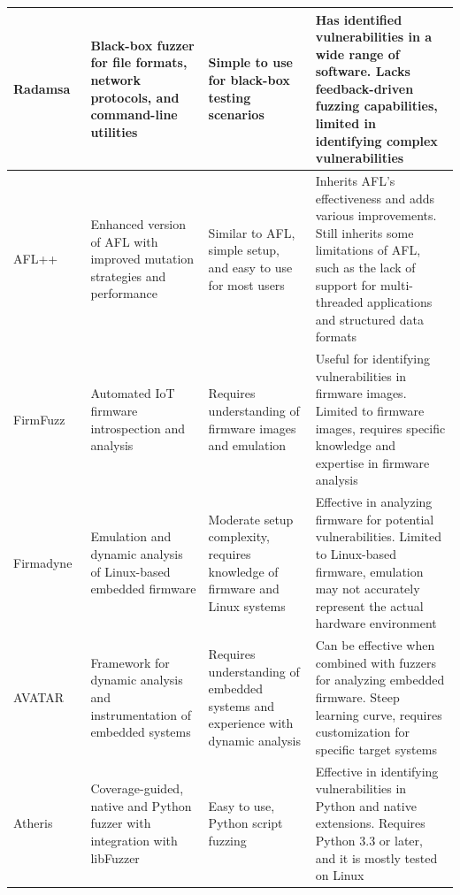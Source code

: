 \begin{longtable}{p{2.5cm}p{3cm}p{3cm}p{5cm}}
\midrule
Radamsa~\cite{AkiHelin96:online} & Black-box fuzzer for file formats, network protocols, and command-line utilities & Simple to use for black-box testing scenarios & Has identified vulnerabilities in a wide range of software. Lacks feedback-driven fuzzing capabilities, limited in identifying complex vulnerabilities \\
\midrule
AFL++~\cite{257204} & Enhanced version of AFL with improved mutation strategies and performance & Similar to AFL, simple setup, and easy to use for most users & Inherits AFL's effectiveness and adds various improvements. Still inherits some limitations of AFL, such as the lack of support for multi-threaded applications and structured data formats \\
\midrule
FirmFuzz~\cite{srivastava2019firmfuzz}~\cite{yun2022fuzzing}  & Automated IoT firmware introspection and analysis & Requires understanding of firmware images and emulation & Useful for identifying vulnerabilities in firmware images. Limited to firmware images, requires specific knowledge and expertise in firmware analysis \\
\midrule
Firmadyne~\cite{chen2016towards} & Emulation and dynamic analysis of Linux-based embedded firmware & Moderate setup complexity, requires knowledge of firmware and Linux systems & Effective in analyzing firmware for potential vulnerabilities. Limited to Linux-based firmware, emulation may not accurately represent the actual hardware environment \\
\midrule
AVATAR~\cite{zaddach2014avatar}  & Framework for dynamic analysis and instrumentation of embedded systems & Requires understanding of embedded systems and experience with dynamic analysis & Can be effective when combined with fuzzers for analyzing embedded firmware. Steep learning curve, requires customization for specific target systems \\
\midrule
Atheris~\cite{GitHubgo74:online} & Coverage-guided, native and Python fuzzer with integration with libFuzzer & Easy to use, Python script fuzzing & Effective in identifying vulnerabilities in Python and native extensions. Requires Python 3.3 or later, and it is mostly tested on Linux \\
\bottomrule
\end{longtable}

